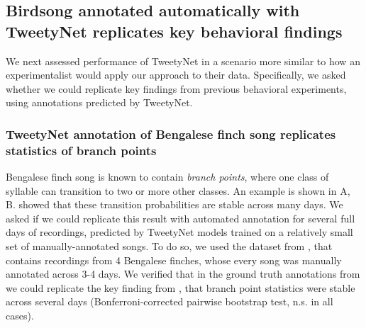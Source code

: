\documentclass[9pt,lineno]{elife}
\begin{document}
\subsection{Birdsong annotated automatically with TweetyNet replicates key behavioral findings}

We next assessed performance of TweetyNet in a scenario 
more similar to how an experimentalist would apply our approach to their data. 
Specifically, 
we asked whether we could replicate key findings from previous behavioral experiments, 
using annotations predicted by TweetyNet. 

\subsubsection{TweetyNet annotation of Bengalese finch song replicates statistics of branch points}

Bengalese finch song is known to contain \textit{branch points}, 
where one class of syllable can transition to two or more other classes. 
An example is shown in A, B.
\cite{warren_variable_2012} showed that these transition probabilities 
are stable across many days. 
We asked if we could replicate this result with 
automated annotation for several full days of recordings, 
predicted by TweetyNet models trained on a relatively small set of manually-annotated songs.  
To do so, we used the dataset from \cite{nicholson_bengalese_2017}, 
that contains recordings from 
4 Bengalese finches, whose every song was manually annotated across 3-4 days. 
We verified that in the ground truth annotations from \cite{nicholson_bengalese_2017} 
we could replicate the key finding from \cite{warren_variable_2012},  
that branch point statistics were stable across several days 
(Bonferroni-corrected pairwise bootstrap test, n.s. in all cases). 
\end{document}
